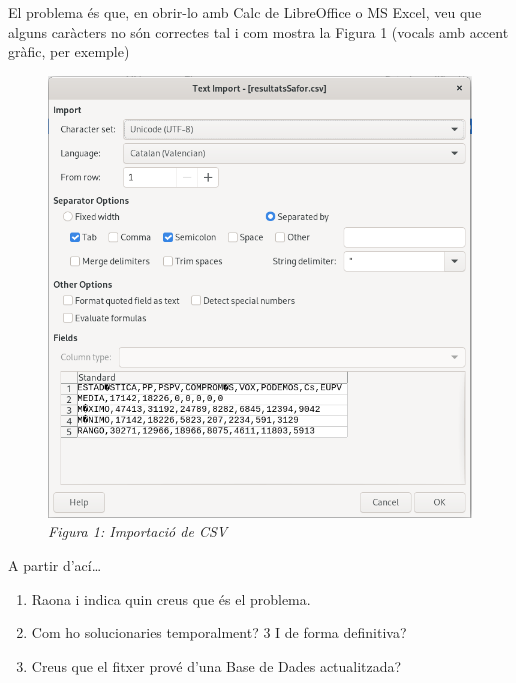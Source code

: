 \documentclass[
  12 pt,
  a4paper,
]{article}
\providecommand{\tightlist}{%
  \setlength{\itemsep}{0pt}\setlength{\parskip}{0pt}}
\begin{document}
El problema és que, en obrir-lo amb Calc de LibreOffice o MS Excel, veu
que alguns caràcters no són correctes tal i com mostra la Figura 1
(vocals amb accent gràfic, per exemple)

\begin{figure}
\centering
\includegraphics{png/resultatsSafor.png}
\caption{\emph{Figura 1: Importació de CSV}}
\end{figure}

A partir d'ací\ldots{}

\begin{enumerate}
\def\labelenumi{\arabic{enumi}.}
\tightlist
\item
  Raona i indica quin creus que és el problema.
\item
  Com ho solucionaries temporalment? 3 I de forma definitiva?
\item
  Creus que el fitxer prové d'una Base de Dades actualitzada?
\end{enumerate}
\end{document}
